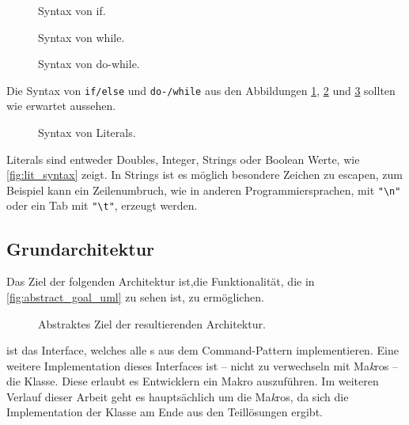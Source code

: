     \begin{figure}[H]
      \centering
      \caption{Syntax von if.}
      \label{fig:if_syntax}
    \end{figure}

    \begin{figure}[H]
      \centering
      \caption{Syntax von while.}
      \label{fig:while_syntax}
    \end{figure}

    \begin{figure}[H]
      \centering
      \caption{Syntax von do-while.}
      \label{fig:do_while_syntax}
    \end{figure}
    Die Syntax von \lstinline[style=MyMacroStyle]$if/else$ und \lstinline[style=MyMacroStyle]$do-/while$ aus den Abbildungen \ref{fig:if_syntax}, \ref{fig:while_syntax} und \ref{fig:do_while_syntax} sollten wie erwartet aussehen.

    \begin{figure}[H]
      \centering
      \caption{Syntax von Literals.}
      \label{fig:lit_syntax}
    \end{figure}
    Literals sind entweder Doubles, Integer, Strings oder Boolean Werte, wie \autoref{fig:lit_syntax} zeigt. In Strings ist es möglich besondere Zeichen zu escapen, zum Beispiel kann ein Zeilenumbruch, wie in anderen Programmiersprachen, mit \lstinline[style=MyMacroStyle]$"\n"$ oder ein Tab mit \lstinline[style=MyMacroStyle]$"\t"$, erzeugt werden.


  \subsection{Grundarchitektur}
  \label{ssec:Grundarchitektur}
    Das Ziel der folgenden Architektur ist,die Funktionalität, die in \autoref{fig:abstract_goal_uml} zu sehen ist, zu ermöglichen.

    \begin{figure}[H]
      \centering
      \caption{Abstraktes Ziel der resultierenden Architektur.}
      \label{fig:abstract_goal_uml}
    \end{figure}
     ist das Interface, welches alle s aus dem Command-Pattern implementieren. Eine weitere Implementation dieses Interfaces ist -- nicht zu verwechseln mit Ma\emph{k}ros -- die  Klasse. Diese erlaubt es Entwicklern ein Makro auszuführen. Im weiteren Verlauf dieser Arbeit geht es hauptsächlich um die Ma\emph{k}ros, da sich die Implementation der  Klasse am Ende aus den Teillösungen ergibt.


